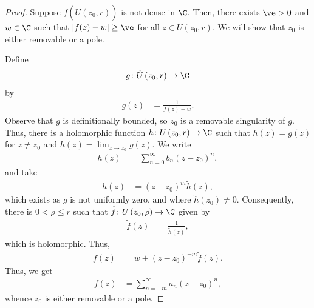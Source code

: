 \documentclass[10pt]{mypackage}
\begin{document}
\begin{proof}
  Suppose $f\left( \dot{U}\left( z_0,r \right) \right)$ is not dense in $\C$. Then, there exists $\ve > 0$ and $w\in \C$ such that $\left\vert f(z) - w \right\vert \geq \ve$ for all $z\in \dot{U}\left( z_0,r \right)$. We will show that $z_0$ is either removable or a pole.\newline

  Define
  \begin{align*}
    g\colon \dot{U}\left( z_0,r \right)\rightarrow \C
  \end{align*}
  by
  \begin{align*}
    g(z) &= \frac{1}{f(z) - w}.
  \end{align*}
  Observe that $g$ is definitionally bounded, so $z_0$ is a removable singularity of $g$. Thus, there is a holomorphic function $h\colon U\left( z_0,r \right)\rightarrow \C$ such that $h(z) = g(z)$ for $z\neq z_0$ and $h(z) = \lim_{z\rightarrow z_0}g(z)$. We write
  \begin{align*}
    h(z) &= \sum_{n=0}^{\infty}b_n\left( z-z_0 \right)^{n},
  \end{align*}
  and take
  \begin{align*}
    h(z) &= \left( z-z_0 \right)^{m} \widetilde{h}(z),
  \end{align*}
  which exists as $g$ is not uniformly zero, and where $ \widetilde{h}\left( z_0 \right) \neq 0 $. Consequently, there is $0 < \rho \leq r$ such that $ \widetilde{f}\colon U\left( z_0,\rho \right)\rightarrow \C $ given by
  \begin{align*}
    \widetilde{f}(z) &= \frac{1}{ \widetilde{h}(z) },
  \end{align*}
  which is holomorphic. Thus,
  \begin{align*}
    f(z) &= w + \left( z-z_0 \right)^{-m} \widetilde{f}(z).
  \end{align*}
  Thus, we get
  \begin{align*}
    f(z) &= \sum_{n=-m}^{\infty} a_n\left( z-z_0 \right)^{n},
  \end{align*}
  whence $z_0$ is either removable or a pole.
\end{proof}
\end{document}
